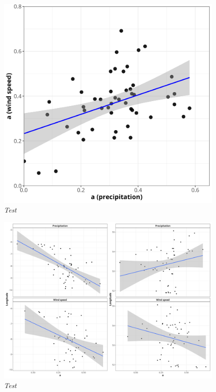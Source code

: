 \documentclass{article}
\numberwithin{equation}{section}
\begin{document}
\begin{figure}[H]
    \centering
    \includegraphics[width = 0.9\linewidth]{plots/046_alpha_rain_vs_ws.png}
    \caption{\emph{Test}}
    \label{fig:04_alpha_rain_vs_ws}
\end{figure}

\begin{figure}[H]
    \centering
    \includegraphics[width = 0.9\linewidth]{plots/047_alpha_vs_lon_lat.png}
    \caption{\emph{Test}}
    \label{fig:04_alpha_vs_lon_lat}
\end{figure}
\end{document}
